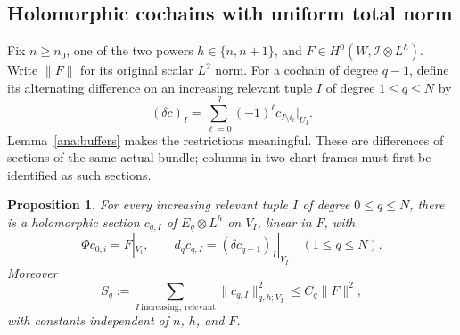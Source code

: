 \documentclass[11pt,reqno]{amsart}
\numberwithin{equation}{section}
\newtheorem{proposition}[theorem]{Proposition}
\theoremstyle{definition}
\theoremstyle{remark}
\newcommand{\cI}{\mathcal I}
\begin{document}
\subsection{Holomorphic cochains with uniform total norm}

Fix $n\geq n_0$, one of the two powers $h\in\{n,n+1\}$, and
$F\in H^0(W,\cI\otimes L^h)$.  Write $\|F\|$ for its original
scalar $L^2$ norm.  For a cochain of degree $q-1$, define its
alternating difference on an increasing relevant tuple $I$ of degree
$1\leq q\leq N$ by
\[
 (\delta c)_I
 =\sum_{\ell=0}^q(-1)^\ell
 c_{I\setminus i_\ell}|_{U_I}.
\]
Lemma~\ref{ana:buffers} makes the restrictions meaningful.
These are differences of sections of the same actual bundle;
columns in two chart frames must first be identified as such sections.

\begin{proposition}\label{ana:holomorphic-cochains}
For every increasing relevant tuple $I$ of degree $0\leq q\leq N$, there is a
holomorphic section $c_{q,I}$ of $E_q\otimes L^h$ on $V_I$, linear
in $F$, with
\begin{equation}\label{ana:cochain-identities}
 \Phi c_{0,i}=F|_{V_i},
 \qquad
 d_qc_{q,I}=(\delta c_{q-1})_I|_{V_I}\quad(1\leq q\leq N).
\end{equation}
Moreover
\begin{equation}\label{ana:cochain-mass}
 S_q:=\sum_{I\ \mathrm{increasing,\ relevant}}
       \|c_{q,I}\|_{q,h;V_I}^2
 \leq C_q\|F\|^2,
\end{equation}
with constants independent of $n$, $h$, and $F$.
\end{proposition}
\end{document}
